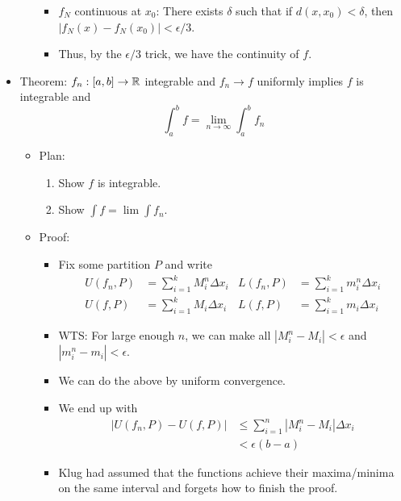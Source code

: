 \documentclass[../notes.tex]{subfiles}
\begin{document}
\begin{itemize}
\begin{itemize}
\begin{itemize}
            \item $f_N$ continuous at $x_0$: There exists $\delta$ such that if $d(x,x_0)<\delta$, then $|f_N(x)-f_N(x_0)|<\epsilon/3$.
            \item Thus, by the $\epsilon/3$ trick, we have the continuity of $f$.
        \end{itemize}
    \end{itemize}
    \item Theorem: $f_n:[a,b]\to\mathbb{R}$ integrable and $f_n\to f$ uniformly implies $f$ is integrable and
    \begin{equation*}
        \int_a^bf = \lim_{n\to\infty}\int_a^bf_n
    \end{equation*}
    \begin{itemize}
        \item Plan:
        \begin{enumerate}
            \item Show $f$ is integrable.
            \item Show $\int f=\lim\int f_n$.
        \end{enumerate}
        \item Proof:
        \begin{itemize}
            \item Fix some partition $P$ and write
            \begin{align*}
                U(f_n,P) &= \sum_{i=1}^kM_i^n\Delta x_i&
                    L(f_n,P) &= \sum_{i=1}^km_i^n\Delta x_i\\
                U(f,P) &= \sum_{i=1}^kM_i\Delta x_i&
                    L(f,P) &= \sum_{i=1}^km_i\Delta x_i
            \end{align*}
            \item WTS: For large enough $n$, we can make all $|M_i^n-M_i|<\epsilon$ and $|m_i^n-m_i|<\epsilon$.
            \item We can do the above by uniform convergence.
            \item We end up with
            \begin{align*}
                |U(f_n,P)-U(f,P)| &\leq \sum_{i=1}^n|M_i^n-M_i|\Delta x_i\\
                &< \epsilon(b-a)
            \end{align*}
            \item Klug had assumed that the functions achieve their maxima/minima on the same interval and forgets how to finish the proof.
        \end{itemize}

\end{itemize}
\end{itemize}
\end{document}
